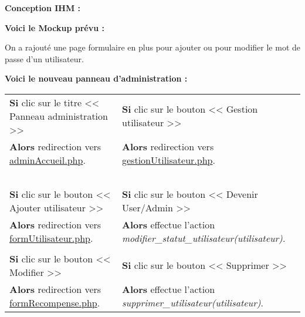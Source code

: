 			\begin{paragraphe}
				\textbf{Conception IHM :}
			\end{paragraphe}

            \begin{paragraphe}
                \textbf{Voici le Mockup prévu :}
            \end{paragraphe}


        \clearpage
    
            \begin{paragraphe}
                On a rajouté une page formulaire en plus pour ajouter ou pour modifier le mot de passe d'un utilisateur.
            \end{paragraphe}
            
            \begin{paragraphe}
                \textbf{Voici le nouveau panneau d'administration :}
            \end{paragraphe}

            \begin{center}
                \begin{tabular}{l | l}
                    \textbf{Si} clic sur le titre << Panneau administration >> & \textbf{Si} clic sur le bouton << Gestion utilisateur >> \\
                    \textbf{Alors} redirection vers \underline{adminAccueil.php}. & \textbf{Alors} redirection vers \underline{gestionUtilisateur.php}. \\ \\

                    \textbf{Si} clic sur le bouton << Ajouter utilisateur >> & \textbf{Si} clic sur le bouton << Devenir User/Admin >> \\
                    \textbf{Alors} redirection vers \underline{formUtilisateur.php}. & \textbf{Alors} effectue l'action \emph{modifier\_statut\_utilisateur(utilisateur)}. \\ \\

                    \textbf{Si} clic sur le bouton << Modifier >> & \textbf{Si} clic sur le bouton << Supprimer >> \\
                    \textbf{Alors} redirection vers \underline{formRecompense.php}. & \textbf{Alors} effectue l'action \emph{supprimer\_utilisateur(utilisateur)}.
                \end{tabular}
            \end{center}
            
